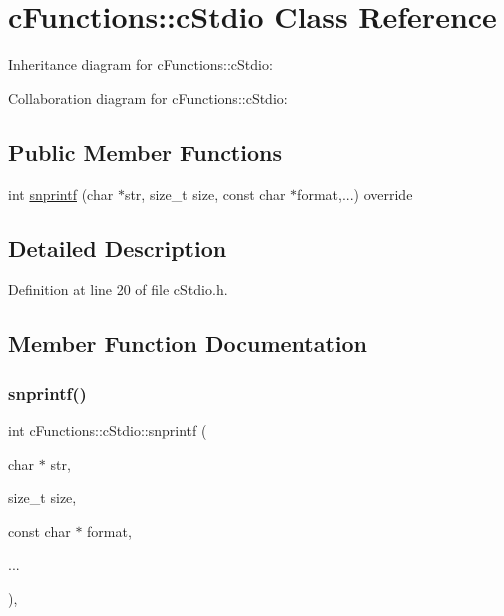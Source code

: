 \hypertarget{classcFunctions_1_1cStdio}{}\section{c\+Functions\+::c\+Stdio Class Reference}
\label{classcFunctions_1_1cStdio}


Inheritance diagram for c\+Functions\+::c\+Stdio\+:


Collaboration diagram for c\+Functions\+::c\+Stdio\+:
\subsection*{Public Member Functions}
\begin{DoxyCompactItemize}
\item 
int \mbox{\hyperlink{classcFunctions_1_1cStdio_a46cf869e8b8b40e2142669f6ddcd141d}{snprintf}} (char $\ast$str, size\+\_\+t size, const char $\ast$format,...) override
\end{DoxyCompactItemize}


\subsection{Detailed Description}


Definition at line 20 of file c\+Stdio.\+h.



\subsection{Member Function Documentation}
\mbox{\label{classcFunctions_1_1cStdio_a46cf869e8b8b40e2142669f6ddcd141d}} 
\subsubsection{\texorpdfstring{snprintf()}{snprintf()}}
{\footnotesize\ttfamily int c\+Functions\+::c\+Stdio\+::snprintf (\begin{DoxyParamCaption}\item[{char $\ast$}]{str,  }\item[{size\+\_\+t}]{size,  }\item[{const char $\ast$}]{format,  }\item[{}]{... }\end{DoxyParamCaption})\hspace{0.3cm}{\ttfamily [override]}, {\ttfamily [virtual]}}

